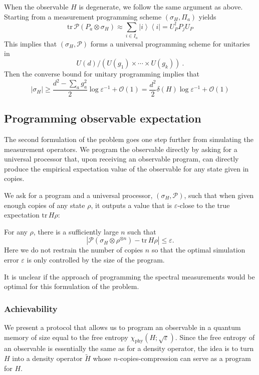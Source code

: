 \documentclass[11pt,letterpaper]{article}
\newcommand{\ketbra}[2]{\left|#1\right\rangle\!\!\left\langle #2\right|}
\def\eps{\varepsilon}
\def\O{\mathcal{O}}
\def\tr{\mathrm{tr}}
\begin{document}
When the observable $H$ is degenerate, we follow the same argument as above. Starting from a measurement programming scheme $(\sigma_H,\Pi_a)$ yields
\begin{equation}
    \tr\,\mathcal{P}(P_a\otimes\sigma_H)\approx \sum_{i\in I_a}\ketbra{i}{i} = U^\dagger_P P_j U_P
\end{equation}
This implies that $(\sigma_H,\mathcal{P})$ forms a universal programming scheme for unitaries in
\begin{equation}
        U(d)\Big/(U(g_1)\times\cdots\times U(g_k))\ .
\end{equation}
Then the converse bound for unitary programming implies that 
\begin{equation}
    |\sigma_H|\ge \frac{d^2-\sum_a g_a^2}{2}\log\eps^{-1} +\O(1) = \frac{d^2}{2}\delta(H)\log\eps^{-1}+\O(1)
\end{equation}

\subsection{Programming observable expectation}
The second formulation of the problem goes one step further from simulating the measurement operators. We program the observable directly by asking for a universal processor that, upon receiving an observable program, can directly produce the empirical expectation value of the observable for any state given in copies. 

We ask for a program and a universal processor, $(\sigma_H,\mathcal{P})$, such that when given enough copies of any state $\rho$, it outputs a value that is $\eps$-close to the true expectation $\tr\, H\rho$:

For any $\rho$, there is a sufficiently large $n$ such that
\begin{equation}
   |\mathcal{P}(\sigma_H\otimes\rho^{\otimes n}) -\tr\, H\rho|\le\eps.
\end{equation}
Here we do not restrain the number of copies $n$ so that the optimal simulation error $\eps$ is only controlled by the size of the program.

It is unclear if the approach of programming the spectral measurements would be optimal for this formulation of the problem.


\subsubsection{Achievability}
We present a protocol that allows us to program an observable in a quantum memory of size equal to the free entropy $\chi_\mathrm{phy}(H;\sqrt{\eps})$. Since the free entropy of an observable is essentially the same as for a density operator, the idea is to turn $H$ into a density operator $\tilde H$ whose $n$-copies-compression can serve as a program for $H$.
\end{document}
